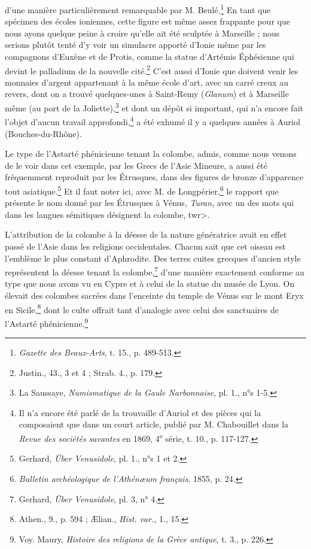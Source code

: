 \documentclass[a4paper, 11pt, oneside]{article}
\begin{document}
d'une manière particulièrement remarquable par M. Beulé.\footnote{\emph{Gazette des Beaux-Arts}, t. 15., p. 489-513.} En tant que spécimen des écoles ioniennes, cette figure est même assez frappante pour que nous ayons quelque peine à croire qu'elle ait été sculptée à Marseille ; nous serions plutôt tenté d'y voir un simulacre apporté d'Ionie même par les compagnons d'Euxène et de Protis, comme la statue d'Artémis Éphésienne qui devint le palladium de la nouvelle cité.\footnote{Justin., 43., 3 et 4 ; Strab. 4., p. 179.} C'est aussi d'Ionie que doivent venir les monnaies d'argent appartenant à la même école d'art, avec un carré creux au revers, dont on a trouvé quelques-unes à Saint-Remy (\emph{Glanum}) et à Marseille même (au port de la Joliette),\footnote{La Saussaye, \emph{Numismatique de la Gaule Narbonnaise}, pl. 1., n°s 1-5.} et dont un dépôt si important, qui n'a encore fait l'objet d'aucun travail approfondi,\footnote{Il n'a encore été parlé de la trouvaille d'Auriol et des pièces qui la composaient que dans un court article, publié par M. Chabouillet dans la \emph{Revue des sociétés savantes} en 1869, 4\textsuperscript{e} série, t. 10., p. 117-127.} a été exhumé il y a quelques années à Auriol (Bouches-du-Rhône).

Le type de l'Astarté phénicienne tenant la colombe, admis, comme nous venons de le voir dans cet exemple, par les Grecs de l'Asie Mineure, a aussi été fréquemment reproduit par les Étrusques, dans des figures de bronze d'apparence tout asiatique.\footnote{Gerhard, \emph{Über Venusidole}, pl. 1., n°s 1 et 2.} Et il faut noter ici, avec M. de Longpérier,\footnote{\emph{Bulletin archéologique de l'Athénæum français}, 1855, p. 24.} le rapport que présente le nom donné par les Étrusques à Vénus, \emph{Turan}, avec un des mots qui dans les langues sémitiques désignent la colombe, \<twr>.

L'attribution de la colombe à la déesse de la nature génératrice avait en effet passé de l'Asie dans les religions occidentales. Chacun sait que cet oiseau est l'emblème le plus constant d'Aphrodite. Des terres cuites grecques d'ancien style représentent la déesse tenant la colombe,\footnote{Gerhard, \emph{Über Venusidole}, pl. 3, n° 4.} d'une manière exactement conforme au type que nous avons vu en Cypre et à celui de la statue du musée de Lyon. On élevait des colombes sacrées dans l'enceinte du temple de Vénus sur le mont Eryx en Sicile,\footnote{Athen., 9., p. 594 ; Ælian., \emph{Hist. var.}, 1., 15.} dont le culte offrait tant d'analogie avec celui des sanctuaires de l'Astarté phénicienne.\footnote{Voy. Maury, \emph{Histoire des religions de la Grèce antique}, t. 3., p. 226.}
\end{document}

